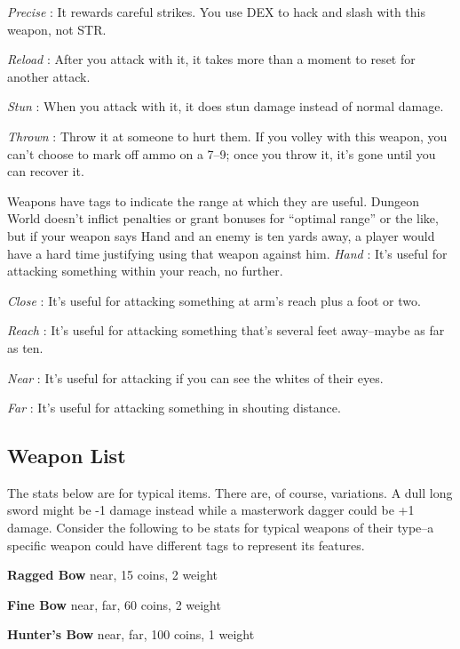 \emph{Precise}
: It rewards careful strikes. You use DEX to hack and slash with this weapon, not STR.

\emph{Reload}
: After you attack with it, it takes more than a moment to reset for another attack. 

\emph{Stun}
: When you attack with it, it does stun damage instead of normal damage. 

\emph{Thrown}
: Throw it at someone to hurt them. If you volley with this weapon, you can't choose to mark off ammo on a 7--9; once you throw it, it's gone until you can recover it. 

Weapons have tags to indicate the range at which they are useful. Dungeon World doesn't inflict penalties or grant bonuses for ``optimal range'' or the like, but if your weapon says Hand and an enemy is ten yards away, a player would have a hard time justifying using that weapon against him.
\emph{Hand}
: It's useful for attacking something within your reach, no further.

\emph{Close}
: It's useful for attacking something at arm's reach plus a foot or two.

\emph{Reach}
: It's useful for attacking something that's several feet away--maybe as far as ten. 

\emph{Near}
: It's useful for attacking if you can see the whites of their eyes. 

\emph{Far}
: It's useful for attacking something in shouting distance.
\subsection{Weapon List}

The stats below are for typical items. There are, of course, variations. A dull long sword might be -1 damage instead while a masterwork dagger could be +1 damage. Consider the following to be stats for typical weapons of their type--a specific weapon could have different tags to represent its features.

{\noindent \bfseries Ragged Bow} \hspace*{\fill} near, 15 coins, 2 weight

{\noindent \bfseries Fine Bow} \hspace*{\fill} near, far, 60 coins, 2 weight

{\noindent \bfseries Hunter's Bow} \hspace*{\fill} near, far, 100 coins, 1 weight


